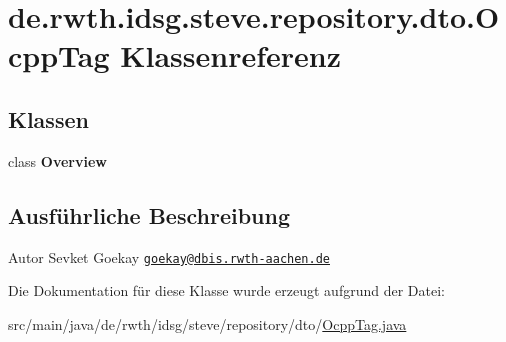 \hypertarget{classde_1_1rwth_1_1idsg_1_1steve_1_1repository_1_1dto_1_1_ocpp_tag}{\section{de.\+rwth.\+idsg.\+steve.\+repository.\+dto.\+Ocpp\+Tag Klassenreferenz}
\label{classde_1_1rwth_1_1idsg_1_1steve_1_1repository_1_1dto_1_1_ocpp_tag}
}
\subsection*{Klassen}
\begin{DoxyCompactItemize}
\item 
class {\bfseries Overview}
\end{DoxyCompactItemize}


\subsection{Ausführliche Beschreibung}
\begin{DoxyAuthor}{Autor}
Sevket Goekay \href{mailto:goekay@dbis.rwth-aachen.de}{\tt goekay@dbis.\+rwth-\/aachen.\+de} 
\end{DoxyAuthor}


Die Dokumentation für diese Klasse wurde erzeugt aufgrund der Datei\+:\begin{DoxyCompactItemize}
\item 
src/main/java/de/rwth/idsg/steve/repository/dto/\hyperlink{_ocpp_tag_8java}{Ocpp\+Tag.\+java}\end{DoxyCompactItemize}

